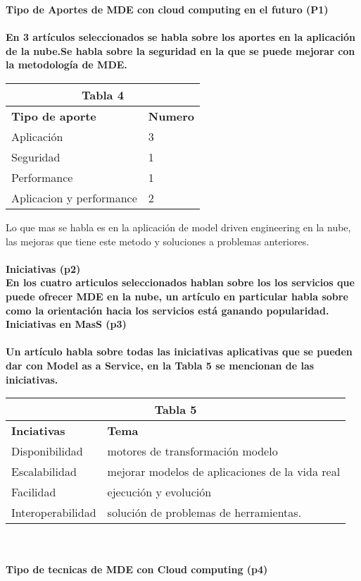 \documentclass{llncs}
\begin{document}
\bf Tipo de Aportes de MDE con cloud computing en el futuro (P1) \\ \\
En 3 artículos seleccionados se habla sobre los aportes en la aplicación de la nube.Se habla sobre la seguridad en la que se puede mejorar con la metodología de MDE.

\begin{tabular}{  | p{5cm} | p{3cm} |}
  \hline
  \multicolumn{2}{|c|}{\bf Tabla 4} \\
  \hline
  \bf Tipo de aporte  & \bf Numero \\
  \hline
  Aplicación & 3 \\
  \hline
  Seguridad & 1 \\
  \hline
   Performance & 1 \\
   \hline
   Aplicacion y performance & 2 \\
   \hline
\end{tabular}
\clearpage
Lo que mas se habla es en la aplicación de model driven engineering en la nube, las mejoras que tiene este metodo y soluciones a problemas anteriores. \\ \\
\bf Iniciativas (p2) \\
En los cuatro articulos seleccionados hablan sobre los los servicios que puede ofrecer MDE en la nube, un artículo en particular habla sobre como  la orientación hacia los servicios está ganando popularidad.
\\
\bf Iniciativas en MasS (p3) \\ \\
Un artículo habla sobre todas las iniciativas aplicativas que se pueden dar con Model as a Service, en la Tabla 5 se mencionan de las iniciativas.
\begin{tabular}{  | p{4cm} | p{7cm} |}
  \hline
  \multicolumn{2}{|c|}{\bf Tabla 5} \\
  \hline
  \bf Inciativas  & \bf Tema \\
  \hline
   Disponibilidad & motores de transformación modelo \\
  \hline
   Escalabilidad & mejorar modelos de aplicaciones de la vida real \\
  \hline
   Facilidad & ejecución y evolución \\
  \hline
   Interoperabilidad & solución de problemas de herramientas. \\
  \hline
\end{tabular} \\ \\
\bf Tipo de tecnicas de MDE con Cloud computing (p4)\\ \\
\end{document}
